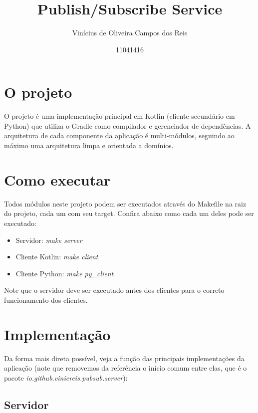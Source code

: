 \documentclass{article}
\title{Publish/Subscribe Service}
\author{Vinícius de Oliveira Campos dos Reis
\and 11041416}
\date{}
\begin{document}
    \maketitle

    \section{O projeto}\label{sec:introducao}

    O projeto é uma implementação principal em Kotlin (cliente secundário em Python) que utiliza o Gradle como compilador e gerenciador de dependências.
    A arquitetura de cada componente da aplicação é multi-módulos, seguindo ao máximo uma arquitetura limpa e orientada a domínios.

    \section{Como executar}\label{sec:como-executar}

    Todos módulos neste projeto podem ser executados através do Makefile na raiz do projeto, cada um com seu target.
    Confira abaixo como cada um deles pode ser executado:

    \begin{itemize}
        \item Servidor: \textit{make server}
        \item Cliente Kotlin: \textit{make client}
        \item Cliente Python: \textit{make py\_client}
    \end{itemize}

    Note que o servidor deve ser executado antes dos clientes para o correto funcionamento dos clientes.

    \section{Implementação}\label{sec:implementacao}

    Da forma mais direta possível, veja a função das principais implementações da aplicação (note que removemos da referência o início comum entre elas, que é o pacote \textit{io.github.vinicreis.pubsub.server}):

    \subsection{Servidor}\label{subsec:server}
\end{document}
